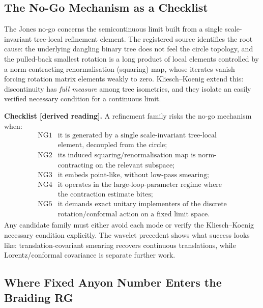 \subsection{The No-Go Mechanism as a Checklist}

The Jones no-go concerns the semicontinuous limit built from a single
scale-invariant tree-local refinement element.  The registered source
identifies the root cause: the underlying dangling binary tree does not feel
the circle topology, and the pulled-back smallest rotation is a long product
of local elements controlled by a norm-contracting renormalisation (squaring)
map, whose iterates vanish --- forcing rotation matrix elements weakly to
zero.  Kliesch--Koenig extend this: discontinuity has \emph{full measure}
among tree isometries, and they isolate an easily verified necessary
condition for a continuous limit.

\textbf{Checklist [derived reading].}  A refinement family risks the no-go
mechanism when:
\[
\begin{array}{ll}
\mathrm{NG1}&\text{it is generated by a single scale-invariant tree-local}\\
            &\text{element, decoupled from the circle;}\\
\mathrm{NG2}&\text{its induced squaring/renormalisation map is norm-}\\
            &\text{contracting on the relevant subspace;}\\
\mathrm{NG3}&\text{it embeds point-like, without low-pass smearing;}\\
\mathrm{NG4}&\text{it operates in the large-loop-parameter regime where}\\
            &\text{the contraction estimate bites;}\\
\mathrm{NG5}&\text{it demands exact unitary implementers of the discrete}\\
            &\text{rotation/conformal action on a fixed limit space.}
\end{array}
\]
Any candidate family must either avoid each mode or verify the
Kliesch--Koenig necessary condition explicitly.  The wavelet precedent shows
what success looks like: translation-covariant smearing recovers continuous
translations, while Lorentz/conformal covariance is separate further work.

\subsection{Where Fixed Anyon Number Enters the Braiding RG}

